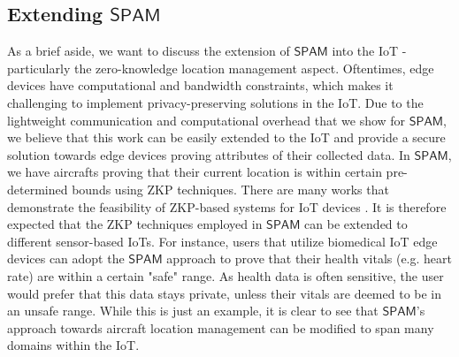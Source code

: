 \documentclass[9pt,sigconf,screen]{acmart}
\newcommand{\yaman}[1]{\textcolor{blue}{{\sf (YJ:} {\sl{#1})}}}
\newcommand\sys{$\mathsf{SPAM}$\xspace}
\begin{document}
\subsection{Extending \sys}
As a brief aside, we want to discuss the extension of \sys into the IoT - particularly the zero-knowledge location management aspect. Oftentimes, edge devices have computational and bandwidth constraints, which makes it challenging to implement privacy-preserving solutions in the IoT. Due to the lightweight communication and computational overhead that we show for \sys, we believe that this work can be easily extended to the IoT and provide a secure solution towards edge devices proving attributes of their collected data. 
In \sys, we have aircrafts proving that their current location is within certain pre-determined bounds using ZKP techniques.  There are many works that demonstrate the feasibility of ZKP-based systems for IoT devices \cite{iot1,litezkp, iot2}. It is therefore expected that the ZKP techniques employed in \sys can be extended to different sensor-based IoTs. For instance, users that utilize biomedical IoT edge devices can adopt the \sys approach to prove that their health vitals (e.g. heart rate) are within a certain "safe" range. As health data is often sensitive, the user would prefer that this data stays private, unless their vitals are deemed to be in an unsafe range. While this is just an example, it is clear to see that \sys's approach towards aircraft location management can be modified to span many domains within the IoT. 
\end{document}
